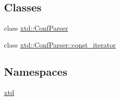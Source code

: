 \subsection*{Classes}
\begin{DoxyCompactItemize}
\item 
class \hyperlink{classxtd_1_1ConfParser}{xtd\-::\-Conf\-Parser}
\item 
class \hyperlink{classxtd_1_1ConfParser_1_1const__iterator}{xtd\-::\-Conf\-Parser\-::const\-\_\-iterator}
\end{DoxyCompactItemize}
\subsection*{Namespaces}
\begin{DoxyCompactItemize}
\item 
\hyperlink{namespacextd}{xtd}
\end{DoxyCompactItemize}
